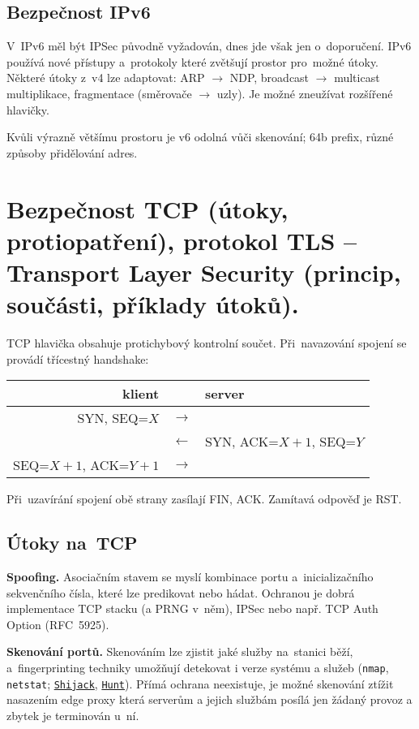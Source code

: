 \subsection{Bezpečnost IPv6}

V~IPv6 měl být IPSec původně vyžadován, dnes jde však jen o~doporučení.
IPv6 používá nové přístupy a~protokoly které zvětšují prostor pro~možné útoky.
Některé útoky z~v4 lze adaptovat: ARP $\rightarrow$ NDP, broadcast $\rightarrow$ multicast multiplikace, fragmentace (směrovače $\rightarrow$ uzly).
Je možné zneužívat rozšířené hlavičky.

Kvůli výrazně většímu prostoru je v6 odolná vůči skenování; 64b prefix, různé způsoby přidělování adres.




\clearpage
\section{Bezpečnost TCP (útoky, protiopatření), protokol TLS -- Transport Layer Security (princip, součásti, příklady útoků).}

TCP hlavička obsahuje protichybový kontrolní součet.
Při~navazování spojení se provádí třícestný handshake:
\begin{center}
\begin{tabular}{rcl}
	klient & & server \\
	\hline
	SYN, SEQ=$X$ & $\rightarrow$ & \\
	& $\leftarrow$ & SYN, ACK=$X+1$, SEQ=$Y$ \\
	SEQ=$X+1$, ACK=$Y+1$ & $\rightarrow$ \\
\end{tabular}
\end{center}
Při~uzavírání spojení obě strany zasílají FIN, ACK.
Zamítavá odpověď je RST.


\subsection{Útoky na~TCP}

\textbf{Spoofing.}
Asociačním stavem se myslí kombinace portu a~inicializačního sekvenčního čísla, které lze predikovat nebo hádat.
Ochranou je dobrá implementace TCP stacku (a PRNG v~něm), IPSec nebo např. TCP Auth Option (RFC~5925).

\textbf{Skenování portů.}
Skenováním lze zjistit jaké služby na~stanici běží, a~fingerprinting techniky umožňují detekovat i verze systému a služeb (\texttt{nmap}, \texttt{netstat}; \href{https://github.com/hackman/shijack}{\texttt{Shijack}}, \href{https://linux.die.net/man/1/hunt}{\texttt{Hunt}}).
Přímá ochrana neexistuje, je možné skenování ztížit nasazením edge proxy která serverům a jejich službám posílá jen žádaný provoz a zbytek je terminován u~ní.

